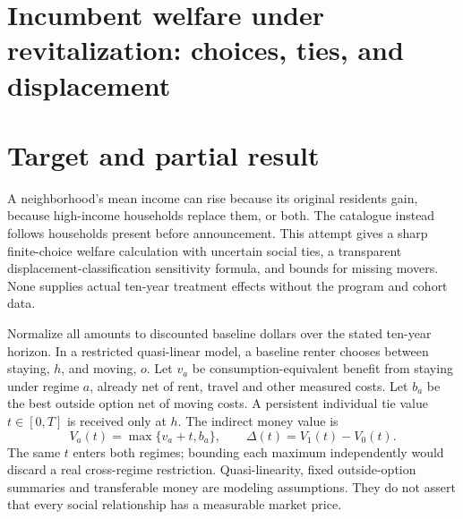 \documentclass[11pt,a4paper]{article}
\begin{document}
\section*{Incumbent welfare under revitalization: choices, ties, and displacement}
\section{Target and partial result}
A neighborhood's mean income can rise because its original residents gain, because high-income households replace them, or both. The catalogue instead follows households present before announcement. This attempt gives a sharp finite-choice welfare calculation with uncertain social ties, a transparent displacement-classification sensitivity formula, and bounds for missing movers. None supplies actual ten-year treatment effects without the program and cohort data.

Normalize all amounts to discounted baseline dollars over the stated ten-year horizon. In a restricted quasi-linear model, a baseline renter chooses between staying, $h$, and moving, $o$. Let $v_a$ be consumption-equivalent benefit from staying under regime $a$, already net of rent, travel and other measured costs. Let $b_a$ be the best outside option net of moving costs. A persistent individual tie value $t\in[0,T]$ is received only at $h$. The indirect money value is
\[
 V_a(t)=\max\{v_a+t,b_a\},\qquad
 \Delta(t)=V_1(t)-V_0(t). \tag{1}
\]
The same $t$ enters both regimes; bounding each maximum independently would discard a real cross-regime restriction. Quasi-linearity, fixed outside-option summaries and transferable money are modeling assumptions. They do not assert that every social relationship has a measurable market price.
\end{document}
